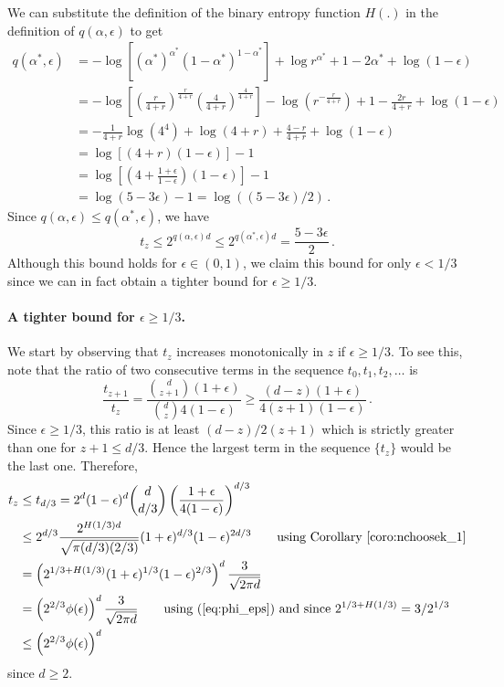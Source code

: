   We can substitute the definition of the binary entropy function $H(.)$ 
  in the definition of $q(\alpha, \epsilon)$ to get 
  \begin{align*}
  q(\alpha^*, \epsilon) 
  &= -\log\left[
  \left(\alpha^*\right)^{\alpha^*}(1-{\alpha^*})^{1-{\alpha^*}}
  \right] 
  + \log r^{\alpha^*} + 1 - 2{\alpha^*} + \log(1-\epsilon) \\
  &= -\log\left[ \left(\frac{r}{4+r}\right)^{\frac{r}{4+r}} \left(\frac{4}{4+r}\right)^{\frac{4}{4+r}}\right] 
   - \log \left(r^{-\frac{r}{4+r}} \right) + 1 - \frac{2r}{4+r}+\log(1-\epsilon) \\
  &= -\frac{1}{4+r} \log(4^4) + \log(4+r)+\frac{4-r}{4+r} + \log(1-\epsilon) \\
  &= \log\left[(4+r)(1-\epsilon)\right] - 1 \\
  &= \log\left[\left(4+\frac{1+\epsilon}{1-\epsilon}\right)(1-\epsilon)\right] - 1 \\
  &= \log(5-3\epsilon) - 1  = \log\left( (5 - 3 \epsilon)/2 \right)
  \,.
  \end{align*} 
  Since $q(\alpha, \epsilon) \leq q(\alpha^*, \epsilon)$, we have 
  \[
      t_z \leq 2^{q(\alpha, \epsilon)d} \leq 2^{q(\alpha^*, \epsilon)d} = \frac{5 - 3 \epsilon}{2}
      \,.
  \]
  Although this bound holds for $\epsilon \in (0, 1)$, we claim this bound for only $\epsilon < 1/3$ 
  since we can in fact obtain a tighter bound for $\epsilon \geq 1/3$. 


  \paragraph{A tighter bound for $\epsilon \geq 1/3$.} 
  We start by observing that $t_z$ increases monotonically in $z$ if $\epsilon \geq 1/3$. 
  To see this, note that the ratio of two consecutive terms in the sequence $t_0, t_1, t_2, \ldots$ is
  \[
  \frac{t_{z+1}}{t_z} 
  =\frac{ {d \choose z+1} (1+\epsilon) }{ {d \choose z} 4(1-\epsilon) } 
  \geq \frac{(d-z)(1+\epsilon)}{4(z+1) (1-\epsilon)}\, .
  \]
  Since $\epsilon \geq 1/3$, this ratio is at least $(d-z)/2(z+1)$ which is 
  strictly greater than one for $z+1 \leq d/3$. 
  Hence the largest term in the sequence $\{t_z\}$ would be the last one. 
  Therefore,
  \begin{align*}
  t_z
  &\leq t_{d/3} = 2^d (1-\epsilon)^d 
  {d \choose d/3} 
  \left(\frac{1+\epsilon}{4(1-\epsilon)}\right)^{d/3} \\
  &\leq 2^{d/3}
  \frac{2^{H(1/3)d}}{\sqrt{ \pi (d/3) (2/3)}} 
  (1+\epsilon)^{d/3}(1-\epsilon)^{2d/3}  \qquad \text{using Corollary~\ref{coro:nchoosek_1}} \\
  &= \left( 2^{1/3 + H(1/3)} (1+\epsilon)^{1/3} (1-\epsilon)^{2/3} \right)^d \frac{3}{\sqrt{2 \pi d}} \\
  &= \left( 2^{2/3} \phi(\epsilon) \right)^d \frac{3}{\sqrt{2 \pi d}} 
  \qquad \text{using (\ref{eq:phi_eps}) and since }2^{1/3 + H(1/3)} = 3/2^{1/3}\\
  &\leq \left( 2^{2/3} \phi(\epsilon) \right)^d
  \end{align*}
  since $d \geq 2$. 

